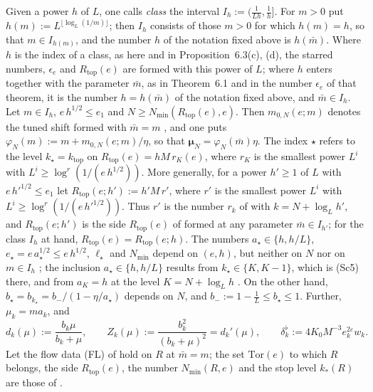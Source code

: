 \documentclass[11pt]{amsart}
\theoremstyle{definition}
\begin{document}
Given a power $h$ of $L$, one calls \emph{class} the interval $I_h:=(\frac1{Lh},\frac1h]$.
For $m>0$ put $h(m):=L^{\lfloor\log_L(1/m)\rfloor}$;
then $I_h$ consists of those $m>0$ for which $h(m)=h$, so that $m\in I_{h(m)}$, and the number $h$ of the notation fixed above is $h(\bar m)$.
Where $h$ is the index of a class, as here and in Proposition~6.3(c), (d), the starred numbers, $\epsilon_e$ and $R_{\mathrm{top}}(e)$ are formed with this power of $L$;
where $h$ enters together with the parameter $\bar m$, as in Theorem~6.1 and in the number $\epsilon_e$ of that theorem, it is the number $h=h(\bar m)$ of the notation fixed above, and $\bar m\in I_h$.
Let $m\in I_h$, $e\,h^{1/2}\le e_1$ and $N\ge N_{\min}(R_{\mathrm{top}}(e),e)$.
Then $m_{0,N}(e;m)$ denotes the tuned shift formed with $\bar m=m$ \cite[Definition before Proposition~28.3]{QEDIII}, and one puts $\varphi_N(m):=m+m_{0,N}(e;m)/\eta$, so that $\boldsymbol\mu_N=\varphi_N(\bar m)\eta$.
The index $\star$ refers to the level $k_\star=k_{\mathrm{top}}$ on $R_{\mathrm{top}}(e)=hM\,r_K(e)$, where $r_K$ is the smallest power $L^i$ with $L^i\ge\log^r(1/(e\,h^{1/2}))$.
More generally, for a power $h'\ge1$ of $L$ with $e\,h'^{1/2}\le e_1$ let $R_{\mathrm{top}}(e;h'):=h'M\,r'$, where $r'$ is the smallest power $L^i$ with $L^i\ge\log^r(1/(e\,h'^{1/2}))$.
Thus $r'$ is the number $r_k$ of \cite[Section~I.6.1]{QEDIII} with $k=N+\log_Lh'$, and $R_{\mathrm{top}}(e;h')$ is the side $R_{\mathrm{top}}(e)$ of \cite[Section~I.6.2]{QEDIII} formed at any parameter $\bar m\in I_{h'}$;
for the class $I_h$ at hand, $R_{\mathrm{top}}(e)=R_{\mathrm{top}}(e;h)$.
The numbers $a_\star\in\{h,h/L\}$, $e_\star=e\,a_\star^{1/2}\le e\,h^{1/2}$, $\ell_\star$ and $N_{\min}$ depend on $(e,h)$, but neither on $N$ nor on $m\in I_h$ \cite[Section~G4.0.2, (Sc0), (Sc1), (Sc5)]{QEDIII};
the inclusion $a_\star\in\{h,h/L\}$ results from $k_\star\in\{K,K-1\}$, which is (Sc5) there, and from $a_K=h$ at the level $K=N+\log_Lh$ \cite[Section~I.6.1]{QEDIII}.
On the other hand, $b_\star=b_{k_\star}=b_-/(1-\eta/a_\star)$ depends on $N$, and $b_-:=1-\frac1L\le b_\star\le1$.
Further, $\mu_k=ma_k$, and
\begin{equation*}
d_k(\mu):=\frac{b_k\mu}{b_k+\mu},\qquad Z_k(\mu):=\frac{b_k^2}{(b_k+\mu)^2}=d_k'(\mu),\qquad\delta^\flat_k:=4K_0M^{-3}e_k^{2\varepsilon}w_k.
\end{equation*}
Let the flow data (FL) of \cite[Sections~I.1.8 and~G4.0.1]{QEDIII} hold on $R$ at $\bar m=m$;
the set $\mathrm{Tor}(e)$ to which $R$ belongs, the side $R_{\mathrm{top}}(e)$, the number $N_{\min}(R,e)$ and the stop level $k_*(R)$ are those of \cite[Section~I.6.2]{QEDIII}.
\end{document}

